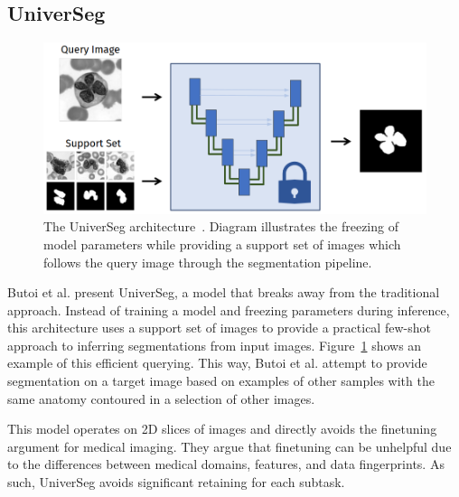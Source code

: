 \documentclass[12pt,twoside]{report}
\begin{document}
\subsection{UniverSeg}

\begin{figure}[H]
  \centering
  \includegraphics[width=.5\linewidth]{../figures/universeg.png}
  \caption{The UniverSeg architecture~\cite{universeg}. Diagram illustrates the freezing of model parameters while providing a support set of images which follows the query image through the segmentation pipeline.}\label{fig:universeg}
\end{figure}

Butoi et al. present UniverSeg, a model that breaks away from the traditional approach. Instead of training a model and freezing parameters during inference, this architecture uses a support set of images to provide a practical few-shot approach to inferring segmentations from input images. Figure~\ref {fig:universeg} shows an example of this efficient querying. This way, Butoi et al. attempt to provide segmentation on a target image based on examples of other samples with the same anatomy contoured in a selection of other images.

This model operates on 2D slices of images and directly avoids the finetuning argument for medical imaging. They argue that finetuning can be unhelpful due to the differences between medical domains, features, and data fingerprints. As such, UniverSeg avoids significant retaining for each subtask.



\end{document}
